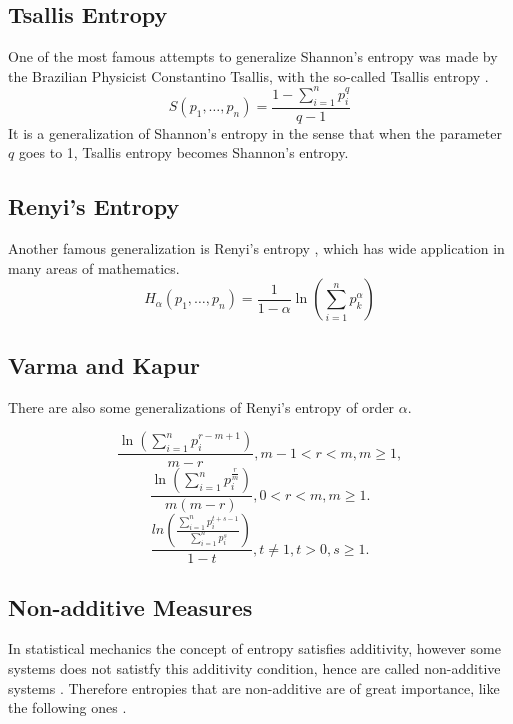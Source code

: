 \documentclass[11pt]{article}
\theoremstyle{plain}
\begin{document}
\subsection*{Tsallis Entropy}
One of the most famous attempts to generalize Shannon's entropy
was made by the Brazilian Physicist Constantino Tsallis, with the
so-called Tsallis entropy \cite{Tsallis2}.
\begin{equation}
S(p_{1},\ldots,p_{n})=\frac{1-\sum_{i=1}^{n} p_{i}^{q}}{q-1}
\end{equation}
It is a generalization of Shannon's entropy in the sense that when
the parameter $q$ goes to 1, Tsallis entropy becomes Shannon's
entropy.

\subsection*{Renyi's Entropy}
Another famous generalization is Renyi's entropy \cite{Renyi},
which has wide application in many areas of mathematics.
\begin{equation}
H_{\alpha}(p_{1},\ldots,p_{n})=\frac{1}{1-\alpha}\ln(\sum_{i=1}^{n}
p_{k}^{\alpha})
\end{equation}

\subsection*{Varma and Kapur}
There are also some generalizations of Renyi's entropy of order
$\alpha$\cite{Varma, Kappur2}.

\begin{equation}
\frac{\ln(\sum_{i=1}^{n} p_{i}^{r-m+1})}{m-r}, m-1<r<m, m\geq 1,
\end{equation}
\begin{equation}
\frac{\ln(\sum_{i=1}^{n} p_{i}^{\frac{r}{m}})}{m(m-r)}, 0<r<m,
m\geq 1.
\end{equation}
\begin{equation}
\frac{ln(\frac{\sum_{i=1}^{n} p_{i}^{t+s-1}}{\sum_{i=1}^{n}
p_{i}^{s}})}{1-t}, t\neq 1, t>0, s\geq 1.
\end{equation}

\subsection*{Non-additive Measures}
In statistical mechanics the concept of entropy satisfies
additivity, however some systems does not satistfy this additivity
condition, hence are called non-additive systems \cite{Tsallis1}.
Therefore entropies that are non-additive are of great importance,
like the following ones \cite{Sharma, Picard}.
\end{document}
